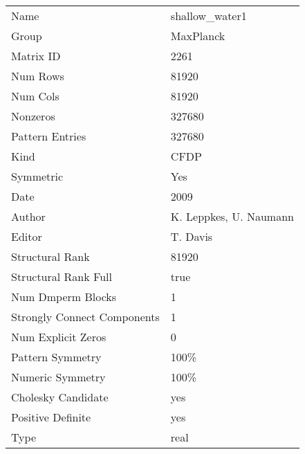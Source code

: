 \begin{tabular}{ll}
\midrule
                       Name &                       shallow\_water1 \\
                      Group &                            MaxPlanck \\
                  Matrix ID &                                 2261 \\
                   Num Rows &                                81920 \\
                   Num Cols &                                81920 \\
                   Nonzeros &                               327680 \\
            Pattern Entries &                               327680 \\
                       Kind & CFDP \\
                  Symmetric &                                  Yes \\
                       Date &                                 2009 \\
                     Author &               K. Leppkes, U. Naumann \\
                     Editor &                             T. Davis \\
            Structural Rank &                                81920 \\
       Structural Rank Full &                                 true \\
          Num Dmperm Blocks &                                    1 \\
Strongly Connect Components &                                    1 \\
         Num Explicit Zeros &                                    0 \\
           Pattern Symmetry &                                 100\% \\
           Numeric Symmetry &                                 100\% \\
         Cholesky Candidate &                                  yes \\
          Positive Definite &                                  yes \\
                       Type &                                 real \\
\bottomrule
\end{tabular}
